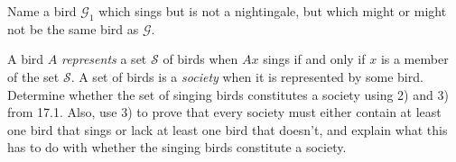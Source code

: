 \documentclass[12pt, letterpaper]{article}
\begin{document}
\begin{prob}{17.2} 
Name a bird $\mathcal{G}_1$ which sings but is not a nightingale, but which might or might not be the same bird as $\mathcal{G}$.
\end{prob}

\begin{prob}{17.3} 
A bird $A$ \emph{represents} a set $\mathcal{S}$ of birds when $Ax$ sings if and only if $x$ is a member of the set $\mathcal{S}$. A set of birds is a \emph{society} when it is represented by some bird. Determine whether the set of singing birds constitutes a society using 2) and 3) from 17.1. Also, use 3) to prove that every society must either contain at least one bird that sings or lack at least one bird that doesn't, and explain what this has to do with whether the singing birds constitute a society.
\end{prob}
\end{document}
